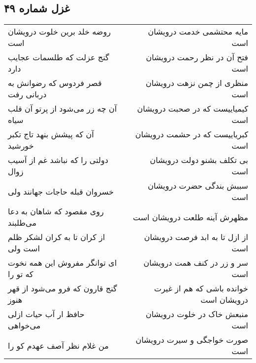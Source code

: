 \begin{center}
\section*{غزل شماره ۴۹}
\label{sec:sh049}
\begin{longtable}{l p{0.5cm} r}
روضه خلد برین خلوت درویشان است
&&
مایه محتشمی خدمت درویشان است
\\
گنج عزلت که طلسمات عجایب دارد
&&
فتح آن در نظر رحمت درویشان است
\\
قصر فردوس که رضوانش به دربانی رفت
&&
منظری از چمن نزهت درویشان است
\\
آن چه زر می‌شود از پرتو آن قلب سیاه
&&
کیمیاییست که در صحبت درویشان است
\\
آن که پیشش بنهد تاج تکبر خورشید
&&
کبریاییست که در حشمت درویشان است
\\
دولتی را که نباشد غم از آسیب زوال
&&
بی تکلف بشنو دولت درویشان است
\\
خسروان قبله حاجات جهانند ولی
&&
سببش بندگی حضرت درویشان است
\\
روی مقصود که شاهان به دعا می‌طلبند
&&
مظهرش آینه طلعت درویشان است
\\
از کران تا به کران لشکر ظلم است ولی
&&
از ازل تا به ابد فرصت درویشان است
\\
ای توانگر مفروش این همه نخوت که تو را
&&
سر و زر در کنف همت درویشان است
\\
گنج قارون که فرو می‌شود از قهر هنوز
&&
خوانده باشی که هم از غیرت درویشان است
\\
حافظ ار آب حیات ازلی می‌خواهی
&&
منبعش خاک در خلوت درویشان است
\\
من غلام نظر آصف عهدم کو را
&&
صورت خواجگی و سیرت درویشان است
\\
\end{longtable}
\end{center}

